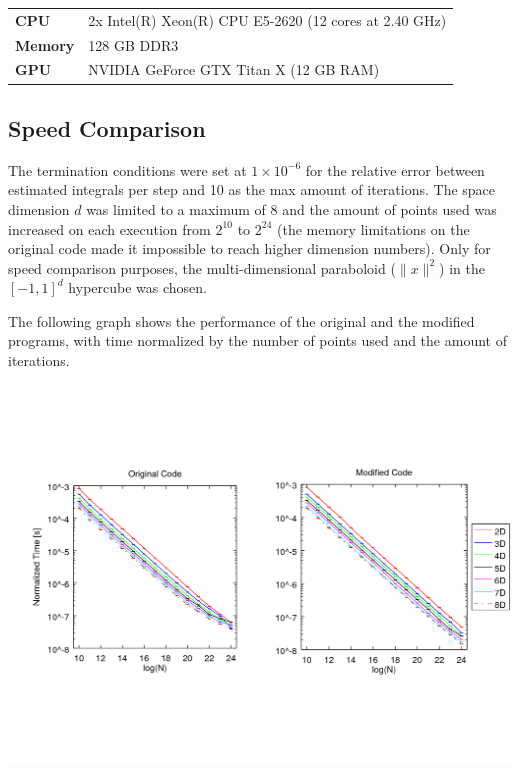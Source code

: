 \documentclass[english]{maciarticle}
\begin{document}
\begin{center}
	\begin{tabular}{ll}
		\hline
		\textbf{CPU} & 2x Intel(R) Xeon(R) CPU E5-2620 (12 cores at 2.40 GHz) \\
		\textbf{Memory} & 128 GB DDR3 \\
		\textbf{GPU} & NVIDIA GeForce GTX Titan X (12 GB RAM)\\
		\hline
	\end{tabular}
\end{center}



\subsection*{Speed Comparison}

The termination conditions were set at $1 \times 10^{-6}$ for the relative error between estimated integrals per step and 10 as the max amount of iterations. The space dimension $d$ was limited to a maximum of 8 and the amount of points used was increased on each execution from $2^{10}$ to $2^{24}$ (the memory limitations on the original code made it impossible to reach higher dimension numbers). Only for speed comparison purposes, the multi-dimensional paraboloid ($\|x\|^2$) in the $[-1,1]^d$ hypercube was chosen.

The following graph shows the performance of the original and the modified programs, with time normalized by the number of points used and the amount of iterations.

\begin{center}
	\includegraphics[width = .9\textwidth]{comparison.png}
\end{center}
\end{document}
